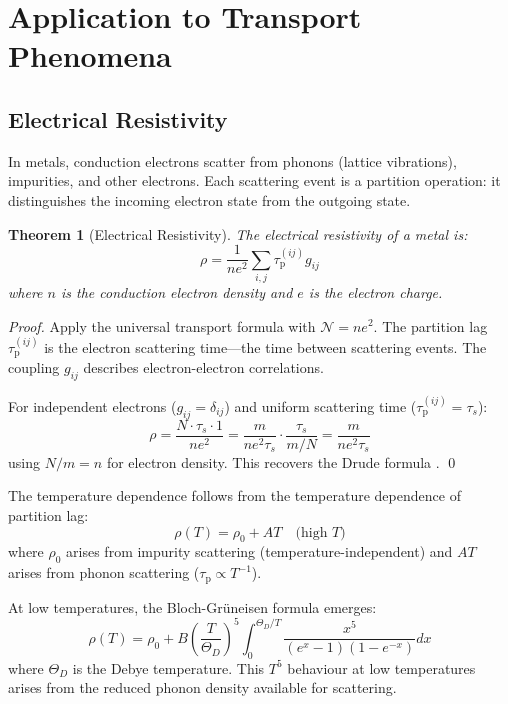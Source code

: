 \documentclass[twocolumn,10pt,aps,prd,superscriptaddress,nofootinbib]{revtex4-2}
\newtheorem{theorem}{Theorem}[section]
\theoremstyle{remark}
\newcommand{\tauP}{\tau_{\mathrm{p}}}
\newcommand{\Gij}{g_{ij}}
\newcommand{\Norm}{\mathcal{N}}
\begin{document}
\section{Application to Transport Phenomena}
\label{sec:transport}

\subsection{Electrical Resistivity}

In metals, conduction electrons scatter from phonons (lattice vibrations), impurities, and other electrons. Each scattering event is a partition operation: it distinguishes the incoming electron state from the outgoing state.

\begin{theorem}[Electrical Resistivity]
\label{thm:resistivity}
The electrical resistivity of a metal is:
\begin{equation}
\rho = \frac{1}{ne^2} \sum_{i,j} \tauP^{(ij)} \Gij
\label{eq:resistivity}
\end{equation}
where $n$ is the conduction electron density and $e$ is the electron charge.
\end{theorem}

\begin{proof}
Apply the universal transport formula with $\Norm = ne^2$. The partition lag $\tauP^{(ij)}$ is the electron scattering time---the time between scattering events. The coupling $\Gij$ describes electron-electron correlations.

For independent electrons ($\Gij = \delta_{ij}$) and uniform scattering time ($\tauP^{(ij)} = \tau_s$):
\begin{equation}
\rho = \frac{N \cdot \tau_s \cdot 1}{ne^2} = \frac{m}{ne^2\tau_s} \cdot \frac{\tau_s}{m/N} = \frac{m}{ne^2\tau_s}
\end{equation}
using $N/m = n$ for electron density. This recovers the Drude formula \cite{drude1900a,drude1900b}. \qed
\end{proof}

The temperature dependence follows from the temperature dependence of partition lag:
\begin{equation}
\rho(T) = \rho_0 + A T \quad \text{(high } T\text{)}
\label{eq:resistivity_temperature}
\end{equation}
where $\rho_0$ arises from impurity scattering (temperature-independent) and $AT$ arises from phonon scattering ($\tauP \propto T^{-1}$).

At low temperatures, the Bloch-Gr\"{u}neisen formula emerges:
\begin{equation}
\rho(T) = \rho_0 + B \left(\frac{T}{\Theta_D}\right)^5 \int_0^{\Theta_D/T} \frac{x^5}{(e^x - 1)(1 - e^{-x})} dx
\label{eq:bloch_gruneisen}
\end{equation}
where $\Theta_D$ is the Debye temperature. This $T^5$ behaviour at low temperatures arises from the reduced phonon density available for scattering.
\end{document}
